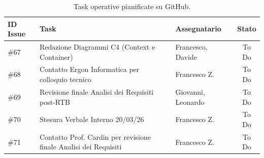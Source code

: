 \documentclass[a4paper, 11pt, oneside]{scrartcl} %
\begin{document}
\begin{table}[h!]
\centering
\begin{tabular}{@{}lllc@{}}
\toprule
\textbf{ID Issue} & \textbf{Task} & \textbf{Assegnatario} & \textbf{Stato} \\
\midrule
\#67 & Redazione Diagrammi C4 (Context e Container) & Francesco, Davide & To Do \\
\#68 & Contatto Ergon Informatica per colloquio tecnico & Francesco Z. & To Do \\
\#69 & Revisione finale Analisi dei Requisiti post-RTB & Giovanni, Leonardo & To Do \\
\#70 & Stesura Verbale Interno 20/03/26 & Francesco Z. & To Do \\
\#71 & Contatto Prof. Cardin per revisione finale Analisi dei Requisiti& Francesco Z. & To Do \\
\bottomrule
\end{tabular}
\caption{Task operative pianificate su GitHub.}
\end{table}

\newpage
\end{document}

